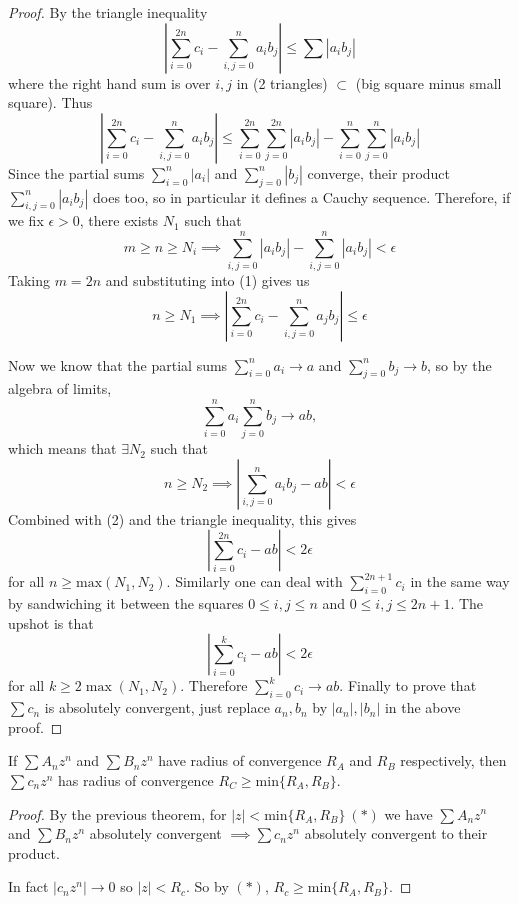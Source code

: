 \documentclass[10pt,twoside]{scrartcl}
\begin{document}
\begin{proof}
By the triangle inequality
\[
  \left|\sum_{i=0}^{2n}c_i - \sum_{i,j = 0}^{n}a_ib_j\right| \leq \sum |a_i b_j|
\]
where the right hand sum is over $i,j$ in (2 triangles) $\subset$ (big square minus small square). Thus
\[
  \left|\sum_{i=0}^{2n} c_i - \sum_{i,j = 0}^n a_ib_j \right| \leq \sum_{i=0}^{2n}\sum_{j=0}^{2n}|a_ib_j| - \sum_{i=0}^{n}\sum_{j=0}^n|a_ib_j| \tag{1}
\]
Since the partial sums $\sum_{i=0}^n|a_i|$ and $\sum_{j=0}^n|b_j|$ converge, their product $\sum_{i,j =0}^n|a_ib_j|$ does too, so in particular it defines a Cauchy sequence. Therefore, if we fix $\epsilon >0$, there exists $N_1$ such that 
\[
  m \geq n \geq N_i \implies \sum_{i,j = 0}^n |a_ib_j| - \sum_{i,j = 0}^n |a_ib_j|< \epsilon 
\]
Taking $m = 2n$ and substituting into (1) gives us
\[
  n \geq N_1 \implies \left|\sum_{i=0}^{2n} c_i - \sum_{i,j = 0}^n a_jb_j\right| \leq \epsilon \tag{2}
\]























Now we know that the partial sums $\sum_{i=0}^n a_i \to a$ and $\sum_{j=0}^n b_j \to b$, so by the algebra of limits, 
\[
  \sum_{i=0}^na_i \sum_{j=0}^n b_j \to ab,
\]
which means that $\exists N_2$ such that 
\[
  n \geq N_2 \implies \left|\sum_{i,j=0}^{n}a_ib_j - ab\right| <\epsilon 
\]
Combined with (2) and the triangle inequality, this gives
\[
  \left|\sum_{i=0}^{2n} c_i - ab\right| < 2\epsilon 
\]
for all $n \geq \mathrm{max}(N_1,N_2)$. Similarly one can deal with $\sum_{i=0}^{2n+1}c_i$ in the same way by sandwiching it between the squares $0 \leq i,j\leq n$ and $0\leq i,j \leq 2n+1$. The upshot is that 
\[
  \left|\sum_{i=0}^{k} c_i - ab\right|< 2\epsilon 
\]
for all $k \geq 2\max(N_1,N_2)$. Therefore $\sum_{i=0}^k c_i \to ab$. Finally to prove that $\sum c_n$ is absolutely convergent, just replace $a_n,b_n$ by $|a_n|,|b_n|$ in the above proof.\end{proof}\vspace*{5pt}

\begin{corollary}
If $\sum A_nz^n$ and $\sum B_nz^n$ have radius of convergence $R_A$ and $R_B$ respectively, then $\sum c_nz^n$ has radius of convergence $R_C \geq \mathrm{min}\{R_A,R_B\}$.	
\end{corollary}
\begin{proof}
By the previous theorem, for $|z| < \mathrm{min}\{R_A,R_B\} ~(*)$ we have $\sum A_nz^n$ and $\sum B_nz^n$ absolutely convergent $\implies \sum c_nz^n$ absolutely convergent to their product. 

In fact $|c_nz^n| \to 0$ so $|z| < R_c$. So by $(*)$, $R_c \geq \mathrm{min}\{R_A,R_B\}$.
\end{proof}\vspace*{5pt}
\end{document}
